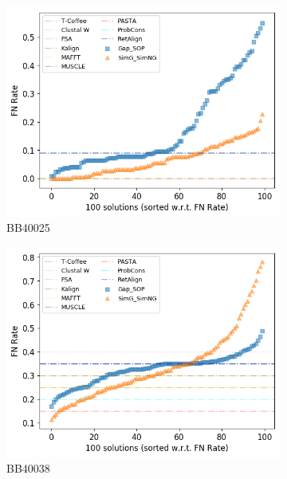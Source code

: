 \begin{figure}[!htbp]
\begin{adjustwidth}{-1cm}{-1cm}
\begin{subfigure}{0.22\textwidth}
		\end{subfigure}
		\begin{subfigure}{0.22\textwidth}
			\includegraphics[width=\columnwidth]{Figure/summary/precomputedInit/Balibase/BB40025_fnrate_density_single_run}
			\caption{BB40025}
		\end{subfigure}
		\begin{subfigure}{0.22\textwidth}
			\includegraphics[width=\columnwidth]{Figure/summary/precomputedInit/Balibase/BB40038_fnrate_density_single_run}
			\caption{BB40038}
		\end{subfigure}
		\begin{subfigure}{0.22\textwidth}

\end{subfigure}
\end{adjustwidth}
\end{figure}
